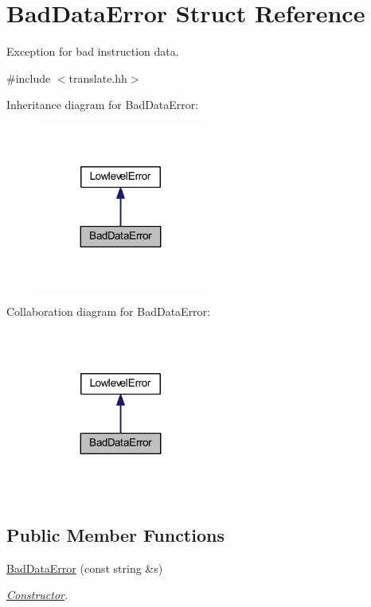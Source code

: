 \hypertarget{struct_bad_data_error}{}\section{Bad\+Data\+Error Struct Reference}
\label{struct_bad_data_error}


Exception for bad instruction data.  




{\ttfamily \#include $<$translate.\+hh$>$}



Inheritance diagram for Bad\+Data\+Error\+:
\nopagebreak
\begin{figure}[H]
\begin{center}
\leavevmode
\includegraphics[width=155pt]{struct_bad_data_error__inherit__graph}
\end{center}
\end{figure}


Collaboration diagram for Bad\+Data\+Error\+:
\nopagebreak
\begin{figure}[H]
\begin{center}
\leavevmode
\includegraphics[width=155pt]{struct_bad_data_error__coll__graph}
\end{center}
\end{figure}
\subsection*{Public Member Functions}
\begin{DoxyCompactItemize}
\item 
\mbox{\hyperlink{struct_bad_data_error_af658d0dd218fe979c377738d0e5ed9ff}{Bad\+Data\+Error}} (const string \&s)
\begin{DoxyCompactList}\small\item\em \mbox{\hyperlink{class_constructor}{Constructor}}. \end{DoxyCompactList}\end{DoxyCompactItemize}
